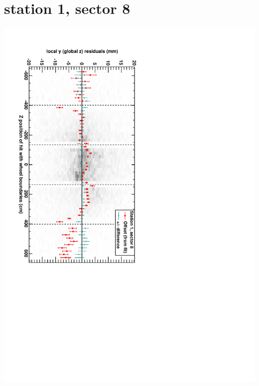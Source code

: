 \documentclass[compress]{beamer}
\begin{document}
\section*{station 1, sector 8}
\begin{frame} \vfill \mbox{\hspace{-1 cm}\includegraphics[height=1.2\linewidth, angle=90]{DTzVsZ_st1_sr08.pdf}} \end{frame}
\end{document}
